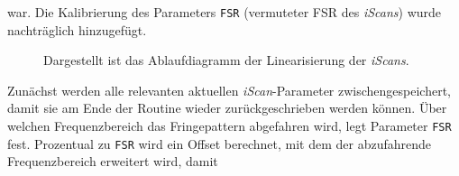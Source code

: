 war. Die Kalibrierung des Parameters \lstinline|FSR| (vermuteter FSR des
\textit{iScans}) wurde nachträglich hinzugefügt.\par
\begin{figure}[hp]
 	\centering
	\caption[Linearisierung der \textit{iScans} -
	Ablaufdiagramm]{Dargestellt ist das Ablaufdiagramm der
	Linearisierung der \textit{iScans}.}\label{fig:linearisierung_ablaufdiagramm}
\end{figure}
Zunächst werden alle relevanten aktuellen \textit{iScan}-Parameter
zwischengespeichert, damit sie am Ende der Routine wieder zurückgeschrieben
werden können. Über welchen Frequenzbereich das Fringepattern abgefahren wird,
legt Parameter \lstinline|FSR| fest.
Prozentual zu \lstinline|FSR| wird ein Offset berechnet, mit dem der abzufahrende Frequenzbereich erweitert wird, damit
